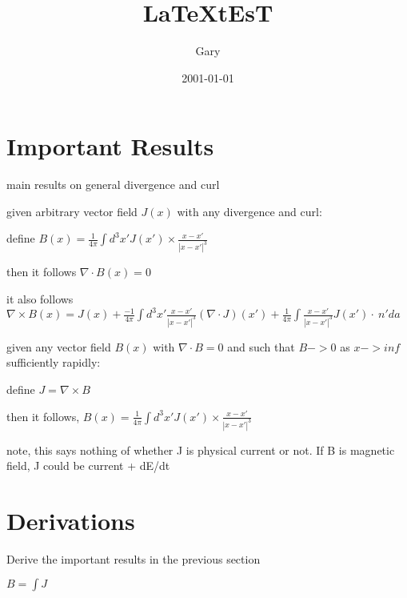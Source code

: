\documentclass[a4paper,12pt]{book}
\begin{document}
\title{\Large{\textbf{LaTeXtEsT}}}
\author{Gary}
\date{2001-01-01}

\maketitle

\section{Important Results}

\noindent main results on general divergence and curl

\indent given arbitrary vector field $J(x)$ with any divergence and curl:
 
\indent define $B(x) = \frac{1}{4\pi} \int d^3x' J(x') \times \frac{x - x'}{|x-x'|^3}$
 
\indent then it follows $\nabla\cdot B(x) = 0$

\indent it also follows $\nabla\times B(x) = J(x) + \frac{-1}{4\pi}\int d^3x' \frac{x-x'}{|x-x'|^3} (\nabla\cdot J)(x') + \frac{1}{4\pi} \int \frac{x-x'}{|x-x'|^3} J(x')\cdot~n' da$

\noindent given any vector field $B(x)$ with $\nabla\cdot B=0$ and such that $B->0$ as $x->inf$ sufficiently rapidly:

\indent define $J = \nabla \times B$

\indent then it follows, $B(x) = \frac{1}{4\pi} \int d^3x' J(x') \times \frac{x - x'}{|x-x'|^3}$

\indent note, this says nothing of whether J is physical current or not. If B is magnetic field, J could be current + dE/dt

\section{Derivations}

Derive the important results in the previous section

$B = \int J$
\end{document}
